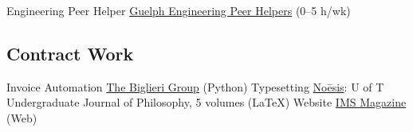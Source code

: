  {Engineering Peer Helper}
  {\href{https://www.uoguelph.ca/engineering/content/current/peer-helper}{Guelph Engineering Peer Helpers} (0--5 h/wk)}
\subsection{Contract Work}
  {Invoice Automation} %
  {\href{https://www.thebiglierigroup.com}{The Biglieri Group} (Python)}
  {Typesetting} %
  {\href{https://www.noesisjournal.com}{No\={e}sis}: U of T Undergraduate Journal of Philosophy, 5 volumes (\LaTeX)}
  {Website} %
  {\href{https://www.imsmagazine.com}{IMS Magazine} (Web)}
